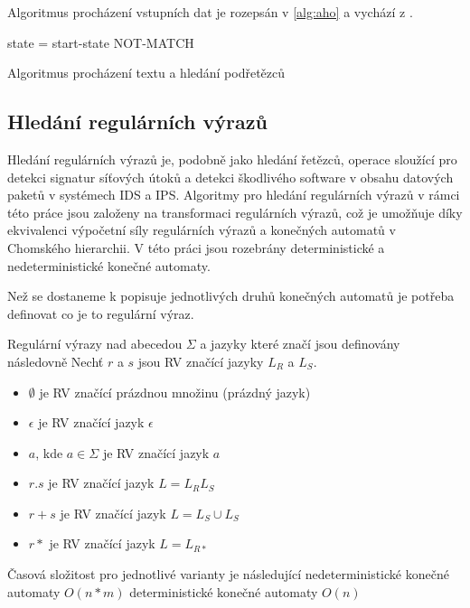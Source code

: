 Algoritmus procházení vstupních dat je rozepsán v \ref{alg:aho} a vychází z \cite{aho}.

\begin{algorithm}[!htbp]
	state = start-state\;
	{
	}
	\Return NOT-MATCH\;
	\caption{Algoritmus procházení textu a hledání podřetězců}
    \label{alg:aho}
\end{algorithm}

\subsection{Hledání regulárních výrazů} %

Hledání regulárních výrazů je, podobně jako hledání řetězců, operace sloužící pro detekci signatur
síťových útoků a detekci škodlivého software v obsahu datových paketů v systémech IDS a IPS.
Algoritmy pro hledání regulárních výrazů v rámci této práce jsou založeny na transformaci
regulárních výrazů, což je umožňuje díky ekvivalenci výpočetní síly regulárních výrazů a konečných automatů
v Chomského hierarchii.
V této práci jsou rozebrány deterministické a nedeterministické konečné automaty.

Než se dostaneme k popisuje jednotlivých druhů konečných automatů je potřeba definovat co je to regulární
výraz.

Regulární výrazy nad abecedou $\Sigma$ a jazyky které značí jsou definovány následovně
Nechť $r$ a $s$ jsou RV značící jazyky $L_R$ a $L_S$.

\begin{itemize}
    \item{$\emptyset$ je RV značící prázdnou množinu (prázdný jazyk)}
    \item{$\epsilon$ je RV značící jazyk ${\epsilon}$}
    \item{$a$, kde $a \in \Sigma$ je RV značící jazyk ${a}$}
    \item{$r.s$ je RV značící jazyk $L = L_R L_S$}
    \item{$r+s$ je RV značící jazyk $L = L_S \cup L_S$}
    \item{$r*$ je RV značící jazyk $L = L_{R*}$}
\end{itemize}

Časová složitost pro jednotlivé varianty je následující
nedeterministické konečné automaty $O(n*m)$
deterministické konečné automaty $O(n)$

